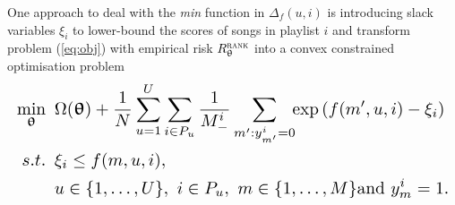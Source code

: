 %
%
%
%

One approach to deal with the \emph{min} function in $\Delta_f(u, i)$ is introducing 
slack variables $\xi_i$ to lower-bound the scores of songs in playlist $i$ %
and 
transform problem (\ref{eq:obj}) with empirical risk $R_{\uptheta}^{\textsc{rank}}$ into a convex constrained optimisation problem %
\begin{equation*}
\resizebox{\columnwidth}{!}{$\displaystyle
\begin{aligned}
\min_{\upthetabm} \ \, & 
\Omega(\upthetabm) 
+ \frac{1}{N} \sum_{u=1}^U \sum_{i \in P_u} \frac{1}{M_-^i} \sum_{m': y_{m'}^i = 0} \!\! \exp \left( f(m', u, i) - \xi_i \right) \\
s.t. \ \, & 
\xi_i \le f(m, u, i), \\
& u \in \{1,\dots,U\}, \ i \in P_u, \ m \in \{1,\dots,M\} \text{and} \ y_m^i = 1.
\end{aligned}
$}
\end{equation*}

